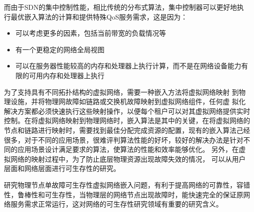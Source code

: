 而由于SDN的集中控制性能，相比传统的分布式算法，集中控制器可以更好地执行最优嵌入算法的计算和提供特殊QoS服务需求，这是因为：
\begin{itemize}
  \item 可以考虑更多的因素，包括当前带宽的负载情况等
  \item 有一个更稳定的网络全局视图
  \item 可以在服务器性能较高的内存和处理器上执行计算，而不是在网络设备能力有限的可用内存和处理器上执行
\end{itemize}


为了支持具有不同拓扑结构的虚拟网络，需要一种嵌入方法将虚拟网络映射 到物理设施，并将物理网故障如链路或交换机故障映射到虚拟网络组件，任何虚 拟化解决方案都必须快速执行这些映射操作，以便每个租户可以对其虚拟网络提供实时控制。在将虚拟网络映射到物理网络时，嵌入算法是其中的关键，在将虚拟网络的节点和链路进行映射时，需要找到最佳分配完成资源的配置，现有的嵌入算法己经很多，对于不同的应用场景，很难评判算法性能的好坏，较好的解决办法是针对不同的应用场景设计满足要求的算法，使算法的性能和效率能够优化。 另外，在虚拟网络的映射过程中，为了防止底层物理资源出现故障失效的情况， 可以从用户层面和网络层面进行可生存性的研究。

研究物理节点单故障可生存性虚拟网络嵌入问题，有利于提高网络的可靠性，容错性，鲁棒性和可生存性，当物理层的网络节点出现故障时，能快速完全的保证原网络服务需求正常运行，这对网络的可生存性研究领域有重要的研究含义。



